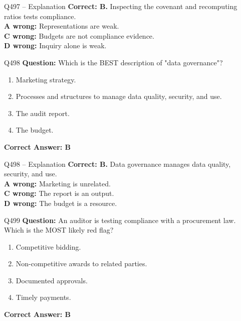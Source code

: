 \documentclass[aspectratio=169,10pt]{beamer}
\begin{document}
	\begin{frame}[t]{Q497 -- Explanation}
		\small
		\textbf{Correct: B.} Inspecting the covenant and recomputing ratios tests compliance. \\[4pt]
		\textbf{A wrong:} Representations are weak. \\[2pt]
		\textbf{C wrong:} Budgets are not compliance evidence. \\[2pt]
		\textbf{D wrong:} Inquiry alone is weak.
	\end{frame}
	
	\begin{frame}[t]{Q498}
		\small
		\textbf{Question:} Which is the BEST description of "data governance"?
		\begin{enumerate}[label=\Alph*.,itemsep=1pt,topsep=2pt]
			\item Marketing strategy.
			\item Processes and structures to manage data quality, security, and use.
			\item The audit report.
			\item The budget.
		\end{enumerate}
		\vspace{4pt}
		\textbf{Correct Answer: B}
	\end{frame}
	
	\begin{frame}[t]{Q498 -- Explanation}
		\small
		\textbf{Correct: B.} Data governance manages data quality, security, and use. \\[4pt]
		\textbf{A wrong:} Marketing is unrelated. \\[2pt]
		\textbf{C wrong:} The report is an output. \\[2pt]
		\textbf{D wrong:} The budget is a resource.
	\end{frame}
	
	\begin{frame}[t]{Q499}
		\small
		\textbf{Question:} An auditor is testing compliance with a procurement law. Which is the MOST likely red flag?
		\begin{enumerate}[label=\Alph*.,itemsep=1pt,topsep=2pt]
			\item Competitive bidding.
			\item Non-competitive awards to related parties.
			\item Documented approvals.
			\item Timely payments.
		\end{enumerate}
		\vspace{4pt}
		\textbf{Correct Answer: B}
	\end{frame}
	
\end{document}
